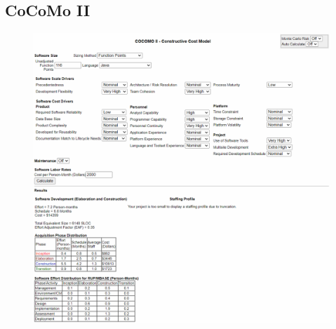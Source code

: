 \documentclass[11pt, a4paper]{article}
\begin{document}
\subsection{CoCoMo II} 
\begin{figure}[H]
    \centering
    \includegraphics[width=1\textwidth]{images/cocomo.png}
\end{figure}


\newpage
\end{document}
